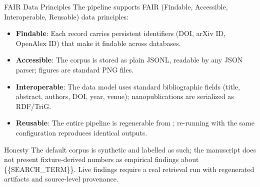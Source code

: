 \documentclass[
  ignorenonframetext,
]{beamer}
\providecommand{\tightlist}{%
  \setlength{\itemsep}{0pt}\setlength{\parskip}{0pt}}
\begin{document}
\begin{frame}{FAIR Data Principles}
\label{fair-data-principles}
The pipeline supports FAIR (Findable, Accessible, Interoperable,
Reusable) data principles:

\begin{itemize}
\tightlist
\item
  \textbf{Findable}: Each record carries persistent identifiers (DOI,
  arXiv ID, OpenAlex ID) that make it findable across databases.
\item
  \textbf{Accessible}: The corpus is stored as plain JSONL, readable by
  any JSON parser; figures are standard PNG files.
\item
  \textbf{Interoperable}: The data model uses standard bibliographic
  fields (title, abstract, authors, DOI, year, venue); nanopublications
  are serialized as RDF/TriG.
\item
  \textbf{Reusable}: The entire pipeline is regenerable from
  ; re-running with the same
  configuration reproduces identical outputs.
\end{itemize}
\end{frame}

\begin{frame}[allowframebreaks]{Honesty}
\label{honesty}
The default corpus is synthetic and labelled as such; the manuscript
does not present fixture-derived numbers as empirical findings about
\{\{SEARCH\_TERM\}\}. Live findings require a real retrieval run with
regenerated artifacts and source-level provenance.
\end{frame}
\end{document}
